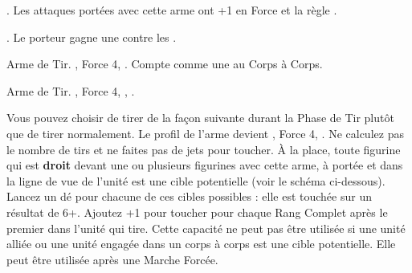 \closearmyspecialrules





\vspace{1.5cm}
\startarmyarmoury

\startitemlistonecol

\listitemonecol{\infernalweapon{}} \hw{}. Les attaques portées avec cette arme ont +1 en Force et la règle \magicalattacks{}.

\listitemonecol{\infernalarmour{}} \platearmour{}. Le porteur gagne une  contre les \flamingattacks{}.

\listitemonecol{\flintlockaxe{}} Arme de Tir. , Force 4, . Compte comme une \halberd{} au Corps à Corps.

\listitemonecol{\blunderbuss{}} Arme de Tir. , Force 4, \walloflead{}, \quicktofire{}.

\enditemlistonecol

\noindent\textbf{\walloflead}

\vspace{5pt}
Vous pouvez choisir de tirer de la façon suivante durant la Phase de Tir plutôt que de tirer normalement. Le profil de l'arme devient , Force 4, \reload{}. Ne calculez pas le nombre de tirs et ne faites pas de jets pour toucher. À la place, toute figurine qui est \textbf{droit} devant une ou plusieurs figurines avec cette arme, à portée et dans la ligne de vue de l'unité est une cible potentielle (voir le schéma ci-dessous). Lancez un dé pour chacune de ces cibles possibles : elle est touchée sur un résultat de 6+. Ajoutez +1 pour toucher pour chaque Rang Complet après le premier dans l'unité qui tire. Cette capacité ne peut pas être utilisée si une unité alliée ou une unité engagée dans un corps à corps est une cible potentielle. Elle peut être utilisée après une Marche Forcée.

\newcommand{\blunderbussfire}{\Largerfontsize\textit{Feu !}}
\def\svgwidth{10cm}
\vspace{0.5cm}\begin{center}

\end{center}

\closearmyarmoury







\startarmymagicalitems

\armymagicalweapons

